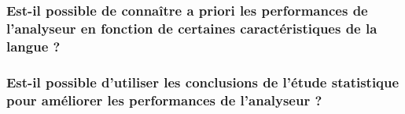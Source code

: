 \documentclass[a4paper, twoside]{article}
\begin{document}
    \subsubsection{Est-il possible de connaître a priori les performances de l’analyseur en fonction de certaines caractéristiques de la langue ?}

    \subsubsection{Est-il possible d’utiliser les conclusions de l’étude statistique pour améliorer les performances de l’analyseur ?}

    \printbibliography
\end{document}
